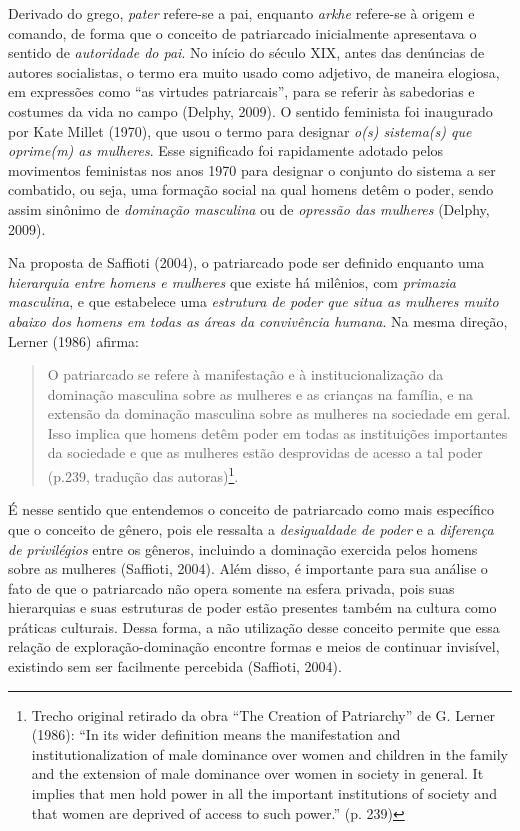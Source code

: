 Derivado do grego, \textit{pater} refere-se a pai, enquanto \textit{arkhe} refere-se à origem e comando, de forma que o conceito de patriarcado inicialmente apresentava o sentido de \textit{autoridade do pai}. No início do século XIX, antes das denúncias de autores socialistas, o termo era muito usado como adjetivo, de maneira elogiosa, em expressões como ``as virtudes patriarcais'', para se referir às sabedorias e costumes da vida no campo (Delphy, 2009). O sentido feminista foi inaugurado por Kate Millet (1970), que usou o termo para designar \textit{o(s) sistema(s) que oprime(m) as mulheres}. Esse significado foi rapidamente adotado pelos movimentos feministas nos anos 1970 para designar o conjunto do sistema a ser combatido, ou seja, uma formação social na qual homens detêm o poder, sendo assim sinônimo de \textit{dominação masculina} ou de \textit{opressão das mulheres} (Delphy, 2009).

Na proposta de Saffioti (2004), o patriarcado pode ser definido enquanto uma \textit{hierarquia entre homens e mulheres} que existe há milênios, com \textit{primazia masculina}, e que estabelece uma \textit{estrutura de poder que situa as mulheres muito abaixo dos homens em todas as áreas da convivência humana}. Na mesma direção, Lerner (1986) afirma:

\begin{quote}
    O patriarcado se refere à manifestação e à institucionalização da dominação masculina sobre as mulheres e as crianças na família, e na extensão da dominação masculina sobre as mulheres na sociedade em geral. Isso implica que homens detêm poder em todas as instituições importantes da sociedade e que as mulheres estão desprovidas de acesso a tal poder (p.239, tradução das autoras)\footnote{Trecho original retirado da obra ``The Creation of Patriarchy'' de G. Lerner (1986): ``In its wider definition means the manifestation and institutionalization of male dominance over women and children in the family and the extension of male dominance over women in society in general. It implies that men hold power in all the important institutions of society and that women are deprived of access to such power.'' (p. 239)}.
\end{quote}

É nesse sentido que entendemos o conceito de patriarcado como mais específico que o conceito de gênero, pois ele ressalta a \textit{desigualdade de poder} e a \textit{diferença de privilégios} entre os gêneros, incluindo a dominação exercida pelos homens sobre as mulheres (Saffioti, 2004). Além disso, é importante para sua análise o fato de que o patriarcado não opera somente na esfera privada, pois suas hierarquias e suas estruturas de poder estão presentes também na cultura como práticas culturais. Dessa forma, a não utilização desse conceito permite que essa relação de exploração-dominação encontre formas e meios de continuar invisível, existindo sem ser facilmente percebida (Saffioti, 2004). 

